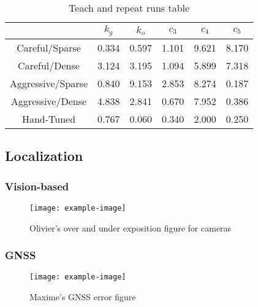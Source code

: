 \documentclass{article}
\begin{document}
\begin{table}[htpb]
	\caption{Teach and repeat runs table} \label{tab:LTR-runs}
	\begin{center}
		\begin{tabular}{|c|c|c|c|c|c|}
			\hline
			& $k_{g}$ & $k_{o}$ & $c_{3}$ & $c_{4}$ & $c_{5}$ \\
			\hline\hline
			Careful/Sparse & 0.334 & 0.597 & 1.101 & 9.621 & 8.170 \\ \hline
			Careful/Dense & 3.124 & 3.195 & 1.094 & 5.899 & 7.318 \\ \hline
			Aggressive/Sparse & 0.840 & 9.153 & 2.853 & 8.274 & 0.187 \\ \hline
			Aggressive/Dense & 4.838 & 2.841 & 0.670 & 7.952 & 0.386 \\ \hline
			Hand-Tuned & 0.767 & 0.060 & 0.340 & 2.000 & 0.250 \\
			\hline
		\end{tabular}
	\end{center}
\end{table}

\subsection{Localization}
\label{sec:res_loc}

\lightlipsum[1]

\subsubsection{Vision-based}
\label{sec:res_vis}

\lightlipsum[1]

\begin{figure} [htpb]
	\centering
	\texttt{[image: example-image]}
	\caption{Olivier's over and under exposition figure for cameras}
	\label{fig:cameras_expo}
\end{figure}

\subsubsection{GNSS}
\label{sec:res_gnss}

\lightlipsum[1]

\begin{figure} [htpb]
	\centering
	\texttt{[image: example-image]}
	\caption{Maxime's GNSS error figure}
	\label{fig:gnss_error}
\end{figure}
\end{document}
